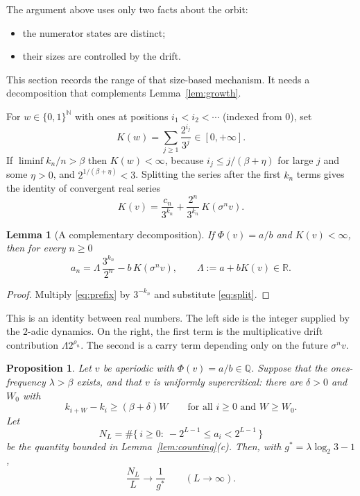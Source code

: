 \documentclass[11pt]{amsart}
\newtheorem{proposition}[theorem]{Proposition}
\newtheorem{lemma}[theorem]{Lemma}
\theoremstyle{definition}
\theoremstyle{remark}
\newcommand{\Q}{\mathbb{Q}}
\newcommand{\N}{\mathbb{N}}
\newcommand{\R}{\mathbb{R}}
\newcommand{\gs}{g^{*}}
\begin{document}
The argument above uses only two facts about the orbit:
\begin{itemize}[leftmargin=2em]
\item the numerator states are distinct;
\item their sizes are controlled by the drift.
\end{itemize}
This section records the range of that size-based mechanism. It needs a decomposition that complements Lemma~\ref{lem:growth}.

For $w\in\{0,1\}^{\N}$ with ones at positions $i_1<i_2<\cdots$ (indexed from $0$), set
\[
K(w)=\sum_{j\ge1}\frac{2^{i_j}}{3^{j}}\in[0,+\infty] .
\]
If $\liminf k_n/n>\beta$ then $K(w)<\infty$, because $i_j\le j/(\beta+\eta)$ for large $j$ and some $\eta>0$, and $2^{1/(\beta+\eta)}<3$. Splitting the series after the first $k_n$ terms gives the identity of convergent real series
\begin{equation}\label{eq:split}
K(v)=\frac{c_n}{3^{k_n}}+\frac{2^n}{3^{k_n}}\,K(\sigma^n v).
\end{equation}

\begin{lemma}[A complementary decomposition]\label{lem:carry}
If $\Phi(v)=a/b$ and $K(v)<\infty$, then for every $n\ge0$
\[
a_n=\Lambda\,\frac{3^{k_n}}{2^n}-b\,K(\sigma^n v),\qquad \Lambda:=a+bK(v)\in\R .
\]
\end{lemma}

\begin{proof}
Multiply \eqref{eq:prefix} by $3^{-k_n}$ and substitute \eqref{eq:split}.
\end{proof}

This is an identity between real numbers. The left side is the integer supplied by the $2$-adic dynamics. On the right, the first term is the multiplicative drift contribution $\Lambda 2^{\rho_n}$. The second is a carry term depending only on the future $\sigma^n v$.

\begin{proposition}\label{prop:scope}
Let $v$ be aperiodic with $\Phi(v)=a/b\in\Q$. Suppose that the ones-frequency $\lambda>\beta$ exists, and that $v$ is uniformly supercritical: there are $\delta>0$ and $W_0$ with
\[
k_{i+W}-k_i\ge(\beta+\delta)W\qquad\text{for all } i\ge0 \text{ and } W\ge W_0 .
\]
Let
\[
N_L=\#\{\,i\ge0:\ -2^{L-1}\le a_i<2^{L-1}\,\}
\]
be the quantity bounded in Lemma~\ref{lem:counting}(c). Then, with $\gs=\lambda\log_2 3-1$,
\[
\frac{N_L}{L}\longrightarrow\frac{1}{\gs}\qquad(L\to\infty).
\]
\end{proposition}
\end{document}
